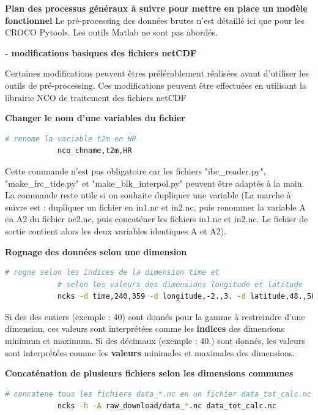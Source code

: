 \documentclass[10pt,a4paper,titlepage]{article}
\begin{document}
\begin{processEnv}{\textbf{Plan des processus généraux à suivre pour mettre en place un modèle fonctionnel}}
    Le pré-processing des données brutes n'est détaillé ici que pour les CROCO Pytools. Les outils Matlab ne sont pas abordés.

    \textbf{- modifications basiques des fichiers netCDF}

    Certaines modifications peuvent êtres préférablement réalisées avant d'utiliser les outils de pré-processing. Ces modifications peuvent être effectuées en utilisant la librairie NCO de traitement des fichiers netCDF

    \begin{codeEnv}{\textbf{Changer le nom d'une variables du fichier}}
        \begin{lstlisting}[language=bash]
            # renome la variable t2m en HR
            nco chname,t2m,HR
        \end{lstlisting}
    \end{codeEnv}

    Cette commande n'est pas obligatoire car les fichiers "ibc\_reader.py", "make\_frc\_tide.py" et "make\_blk\_interpol.py" peuvent être adaptés à la main.
    La commande reste utile si on souhaite dupliquer une variable (La marche à suivre est : dupliquer un fichier en in1.nc et in2.nc, puis renommer la variable A en A2 du fichier nc2.nc, puis concaténer les fichiers in1.nc et in2.nc. Le fichier de sortie contient alors les deux variables identiques A et A2).

    \begin{codeEnv}{\textbf{Rognage des données selon une dimension}}
        \begin{lstlisting}[language=bash]
            # rogne selon les indices de la dimension time et
            # selon les valeurs des dimensions longitude et latitude
            ncks -d time,240,359 -d longitude,-2.,3. -d latitude,48.,50. in.nc out.nc
        \end{lstlisting}
    \end{codeEnv}

    Si des des entiers (exemple : 40) sont donnés pour la gamme à restreindre d'une dimension, ces valeurs sont interprétées comme les \textbf{indices} des dimensions minimum et maximum. Si des décimaux (exemple : 40.) sont donnés, les valeurs sont interprétées comme les \textbf{valeurs }minimales et maximales des dimensions.

    \begin{codeEnv}{\textbf{Concaténation de plusieurs fichiers selon les dimensions communes}}
        \begin{lstlisting}[language=bash]
            # concatene tous les fichiers data_*.nc en un fichier data_tot_calc.nc
            ncks -h -A raw_download/data_*.nc data_tot_calc.nc
        \end{lstlisting}
    \end{codeEnv}


\end{processEnv}
\end{document}
